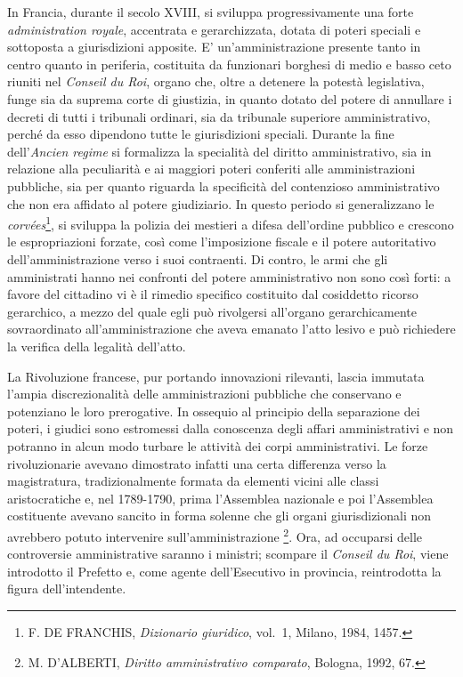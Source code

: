 \documentclass[12pt,it,a4paper,]{report}
\begin{document}
In Francia, durante il secolo XVIII, si sviluppa progressivamente una
forte \emph{administration royale}, accentrata e gerarchizzata, dotata
di poteri speciali e sottoposta a giurisdizioni apposite. E'
un'amministrazione presente tanto in centro quanto in periferia,
costituita da funzionari borghesi di medio e basso ceto riuniti nel
\emph{Conseil du Roi}, organo che, oltre a detenere la potestà
legislativa, funge sia da suprema corte di giustizia, in quanto dotato
del potere di annullare i decreti di tutti i tribunali ordinari, sia da
tribunale superiore amministrativo, perché da esso dipendono tutte le
giurisdizioni speciali. Durante la fine dell'\emph{Ancien regime} si
formalizza la specialità del diritto amministrativo, sia in relazione
alla peculiarità e ai maggiori poteri conferiti alle amministrazioni
pubbliche, sia per quanto riguarda la specificità del contenzioso
amministrativo che non era affidato al potere giudiziario. In questo
periodo si generalizzano le \emph{corvées}\footnote{F. DE FRANCHIS,
  \emph{Dizionario giuridico}, vol.~1, Milano, 1984, 1457.}, si sviluppa
la polizia dei mestieri a difesa dell'ordine pubblico e crescono le
espropriazioni forzate, così come l'imposizione fiscale e il potere
autoritativo dell'amministrazione verso i suoi contraenti. Di contro, le
armi che gli amministrati hanno nei confronti del potere amministrativo
non sono così forti: a favore del cittadino vi è il rimedio specifico
costituito dal cosiddetto ricorso gerarchico, a mezzo del quale egli può
rivolgersi all'organo gerarchicamente sovraordinato all'amministrazione
che aveva emanato l'atto lesivo e può richiedere la verifica della
legalità dell'atto.

La Rivoluzione francese, pur portando innovazioni rilevanti, lascia
immutata l'ampia discrezionalità delle amministrazioni pubbliche che
conservano e potenziano le loro prerogative. In ossequio al principio
della separazione dei poteri, i giudici sono estromessi dalla conoscenza
degli affari amministrativi e non potranno in alcun modo turbare le
attività dei corpi amministrativi. Le forze rivoluzionarie avevano
dimostrato infatti una certa differenza verso la magistratura,
tradizionalmente formata da elementi vicini alle classi aristocratiche
e, nel 1789-1790, prima l'Assemblea nazionale e poi l'Assemblea
costituente avevano sancito in forma solenne che gli organi
giurisdizionali non avrebbero potuto intervenire sull'amministrazione
\footnote{M. D'ALBERTI, \emph{Diritto amministrativo comparato},
  Bologna, 1992, 67.}. Ora, ad occuparsi delle controversie
amministrative saranno i ministri; scompare il \emph{Conseil du Roi},
viene introdotto il Prefetto e, come agente dell'Esecutivo in provincia,
reintrodotta la figura dell'intendente.
\end{document}
